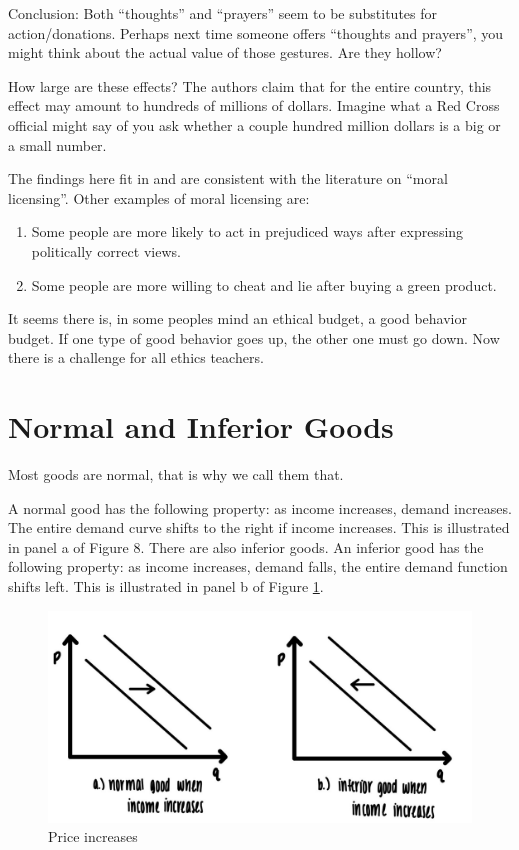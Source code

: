 \documentclass[
]{book}
\providecommand{\tightlist}{%
  \setlength{\itemsep}{0pt}\setlength{\parskip}{0pt}}
\begin{document}
Conclusion: Both ``thoughts'' and ``prayers'' seem to be substitutes for action/donations. Perhaps next time someone offers ``thoughts and prayers'', you might think about the actual value of those gestures. Are they hollow?

How large are these effects? The authors claim that for the entire country, this effect may amount to hundreds of millions of dollars. Imagine what a Red Cross official might say of you ask whether a couple hundred million dollars is a big or a small number.

The findings here fit in and are consistent with the literature on ``moral licensing''. Other examples of moral licensing are:

\begin{enumerate}
\def\labelenumi{\arabic{enumi}.}
\tightlist
\item
  Some people are more likely to act in prejudiced ways after expressing politically correct views.
\item
  Some people are more willing to cheat and lie after buying a green product.
\end{enumerate}

It seems there is, in some peoples mind an ethical budget, a good behavior budget. If one type of good behavior goes up, the other one must go down. Now there is a challenge for all ethics teachers.

\hypertarget{normal-and-inferior-goods}{%
\section{Normal and Inferior Goods}\label{normal-and-inferior-goods}}

Most goods are normal, that is why we call them that.

A normal good has the following property: as income increases, demand increases. The entire demand curve shifts to the right if income increases. This is illustrated in panel a of Figure 8. There are also inferior goods. An inferior good has the following property: as income increases, demand falls, the entire demand function shifts left. This is illustrated in panel b of Figure \ref{fig:demand09}.

\begin{figure}

{\centering \includegraphics[width=1\linewidth]{img/demand/fig9} 

}

\caption{Price increases}\label{fig:demand09}
\end{figure}
\end{document}
